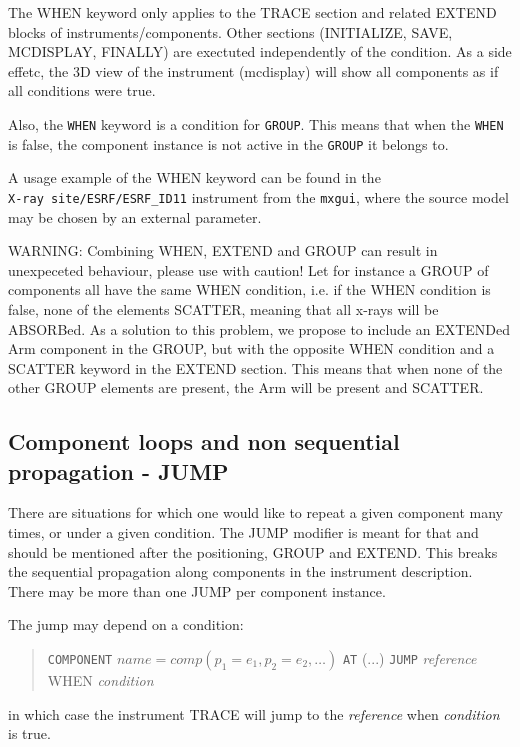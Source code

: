 The WHEN keyword only applies to the TRACE section and related EXTEND blocks of instruments/components. Other sections (INITIALIZE, SAVE, MCDISPLAY, FINALLY) are exectuted independently of the condition. As a side effetc, the 3D view of the instrument (mcdisplay) will show all components as if all conditions were true.

Also, the \verb+WHEN+ keyword is a condition for \verb+GROUP+. This means that when the \verb+WHEN+ is false, the component instance is not active in the \verb+GROUP+ it belongs to.

A usage example of the WHEN keyword can be found in the \\
\verb+X-ray site/ESRF/ESRF_ID11+ instrument from the \verb+mxgui+, where the source model may be chosen by an external parameter.


WARNING: Combining WHEN, EXTEND and GROUP can result in unexpeceted behaviour, please use with caution! Let for instance a GROUP of components all have the same WHEN condition, i.e. if the WHEN condition is false, none of the elements SCATTER, meaning that all x-rays will be ABSORBed. As a solution to this problem, we propose to include an EXTENDed Arm component in the GROUP, but with the opposite WHEN condition and a SCATTER keyword in the EXTEND section. This means that when none of the other GROUP elements are present, the Arm will be present and SCATTER.


\subsection{Component loops and non sequential propagation - JUMP}
\label{s:instrdefs-extend-jump}

There are situations for which one would like to repeat a given component many times, or under a given condition. The JUMP modifier is meant for that and should be mentioned after the positioning, GROUP and EXTEND. This breaks the sequential propagation along components in the instrument description. There may be more than one JUMP per component instance.

The jump may depend on a condition:
\begin{quote}
  \texttt{COMPONENT} $\textit{name} = \textit{comp}(p_1 = e_1, p_2 = e_2, \ldots)$
  \texttt{AT} (...)
  \texttt{JUMP} \textit{reference} WHEN \textit{condition}
\end{quote}
in which case the instrument TRACE will jump to the \textit{reference} when \textit{condition} is true.

